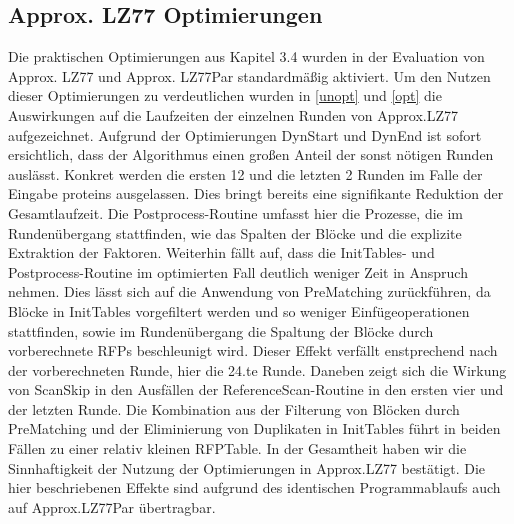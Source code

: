 \subsection{Approx. LZ77 Optimierungen}
Die praktischen Optimierungen aus Kapitel 3.4 wurden in der Evaluation von Approx. LZ77 und Approx. LZ77Par standardmäßig aktiviert. Um den Nutzen dieser Optimierungen
zu verdeutlichen wurden in \ref{unopt} und \ref{opt} die Auswirkungen auf die Laufzeiten der einzelnen Runden von Approx.LZ77 aufgezeichnet. Aufgrund der 
Optimierungen DynStart und DynEnd ist sofort ersichtlich, dass der Algorithmus einen großen Anteil der sonst nötigen Runden auslässt. Konkret werden die ersten 12 und
die letzten 2 Runden im Falle der Eingabe proteins ausgelassen. Dies bringt bereits eine signifikante Reduktion der Gesamtlaufzeit. Die Postprocess-Routine umfasst hier 
die Prozesse, die im Rundenübergang stattfinden, wie das Spalten der Blöcke und die explizite Extraktion der Faktoren.
Weiterhin fällt auf, dass die InitTables- und Postprocess-Routine im optimierten Fall deutlich weniger Zeit in Anspruch nehmen.  Dies lässt sich auf die Anwendung von 
PreMatching zurückführen, da Blöcke in InitTables vorgefiltert werden und so weniger Einfügeoperationen stattfinden, sowie im Rundenübergang die Spaltung der Blöcke 
durch vorberechnete RFPs beschleunigt wird. Dieser Effekt verfällt enstprechend nach der vorberechneten Runde, hier die 24.te Runde. Daneben zeigt sich die Wirkung von 
ScanSkip in den Ausfällen der ReferenceScan-Routine in den ersten vier und der letzten Runde. Die Kombination aus der Filterung von Blöcken durch PreMatching und der
Eliminierung von Duplikaten in InitTables führt in beiden Fällen zu einer relativ kleinen RFPTable. In der Gesamtheit haben wir die Sinnhaftigkeit der Nutzung der 
Optimierungen in Approx.LZ77 bestätigt. Die hier beschriebenen Effekte sind aufgrund des identischen Programmablaufs auch auf Approx.LZ77Par übertragbar.

